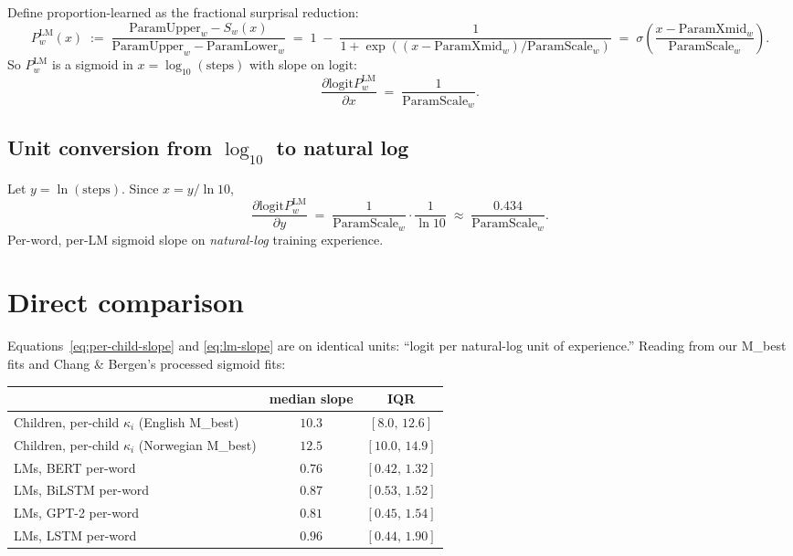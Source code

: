 \documentclass[11pt]{article}
\newcommand{\logit}{\mathrm{logit}}
\begin{document}
Define proportion-learned as the fractional surprisal reduction:
\begin{equation}
P_{w}^{\mathrm{LM}}(x)
\;:=\;
\frac{\mathrm{ParamUpper}_w - S_w(x)}
     {\mathrm{ParamUpper}_w - \mathrm{ParamLower}_w}
\;=\;
1 \;-\; \frac{1}{1+\exp((x - \mathrm{ParamXmid}_w)/\mathrm{ParamScale}_w)}
\;=\;
\sigma\!\!\left(\frac{x - \mathrm{ParamXmid}_w}{\mathrm{ParamScale}_w}\right).
\end{equation}
So $P_w^{\mathrm{LM}}$ is a sigmoid in $x = \log_{10}(\text{steps})$
with slope on $\logit$:
\begin{equation}
\frac{\partial \logit P_w^{\mathrm{LM}}}{\partial x} \;=\; \frac{1}{\mathrm{ParamScale}_w}.
\end{equation}

\subsection{Unit conversion from $\log_{10}$ to natural log}

Let $y = \ln(\text{steps})$. Since $x = y/\ln 10$,
\begin{equation}
\boxed{
\frac{\partial \logit P_w^{\mathrm{LM}}}{\partial y}
\;=\;
\frac{1}{\mathrm{ParamScale}_w}\cdot\frac{1}{\ln 10}
\;\approx\;
\frac{0.434}{\mathrm{ParamScale}_w}.
}
\label{eq:lm-slope}
\end{equation}
Per-word, per-LM sigmoid slope on \emph{natural-log} training experience.

\section{Direct comparison}

Equations~\eqref{eq:per-child-slope} and \eqref{eq:lm-slope} are
on identical units: ``logit per natural-log unit of experience.''
Reading from our M\_best fits and Chang \& Bergen's processed sigmoid
fits:

\begin{center}
\renewcommand{\arraystretch}{1.20}
\begin{tabular}{@{}lcc@{}}
\toprule
& \textbf{median slope} & \textbf{IQR} \\
\midrule
Children, per-child $\kappa_i$ (English M\_best) & $10.3$ & $[8.0,\,12.6]$ \\
Children, per-child $\kappa_i$ (Norwegian M\_best) & $12.5$ & $[10.0,\,14.9]$ \\
LMs, BERT per-word                                & $0.76$ & $[0.42,\,1.32]$ \\
LMs, BiLSTM per-word                              & $0.87$ & $[0.53,\,1.52]$ \\
LMs, GPT-2 per-word                               & $0.81$ & $[0.45,\,1.54]$ \\
LMs, LSTM per-word                                & $0.96$ & $[0.44,\,1.90]$ \\
\bottomrule
\end{tabular}
\end{center}
\end{document}
